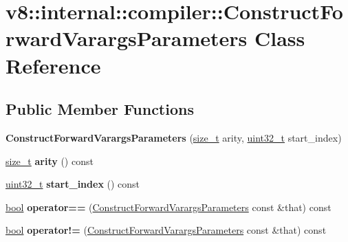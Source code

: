 \hypertarget{classv8_1_1internal_1_1compiler_1_1ConstructForwardVarargsParameters}{}\section{v8\+:\+:internal\+:\+:compiler\+:\+:Construct\+Forward\+Varargs\+Parameters Class Reference}
\label{classv8_1_1internal_1_1compiler_1_1ConstructForwardVarargsParameters}
\subsection*{Public Member Functions}
\begin{DoxyCompactItemize}
\item 
\mbox{\label{classv8_1_1internal_1_1compiler_1_1ConstructForwardVarargsParameters_a2fbbe4ce88ff1a08ae2644acd02a4780}} 
{\bfseries Construct\+Forward\+Varargs\+Parameters} (\mbox{\hyperlink{classsize__t}{size\+\_\+t}} arity, \mbox{\hyperlink{classuint32__t}{uint32\+\_\+t}} start\+\_\+index)
\item 
\mbox{\label{classv8_1_1internal_1_1compiler_1_1ConstructForwardVarargsParameters_aee4a2051100d4f8d4420fc54305187a2}} 
\mbox{\hyperlink{classsize__t}{size\+\_\+t}} {\bfseries arity} () const
\item 
\mbox{\label{classv8_1_1internal_1_1compiler_1_1ConstructForwardVarargsParameters_a24d24b6ce9e0798e22c165cde1c3bf47}} 
\mbox{\hyperlink{classuint32__t}{uint32\+\_\+t}} {\bfseries start\+\_\+index} () const
\item 
\mbox{\label{classv8_1_1internal_1_1compiler_1_1ConstructForwardVarargsParameters_a59e56e969cd9b98c78977fceca149971}} 
\mbox{\hyperlink{classbool}{bool}} {\bfseries operator==} (\mbox{\hyperlink{classv8_1_1internal_1_1compiler_1_1ConstructForwardVarargsParameters}{Construct\+Forward\+Varargs\+Parameters}} const \&that) const
\item 
\mbox{\label{classv8_1_1internal_1_1compiler_1_1ConstructForwardVarargsParameters_a8e5713994089add998e68817ca2154bb}} 
\mbox{\hyperlink{classbool}{bool}} {\bfseries operator!=} (\mbox{\hyperlink{classv8_1_1internal_1_1compiler_1_1ConstructForwardVarargsParameters}{Construct\+Forward\+Varargs\+Parameters}} const \&that) const
\end{DoxyCompactItemize}
